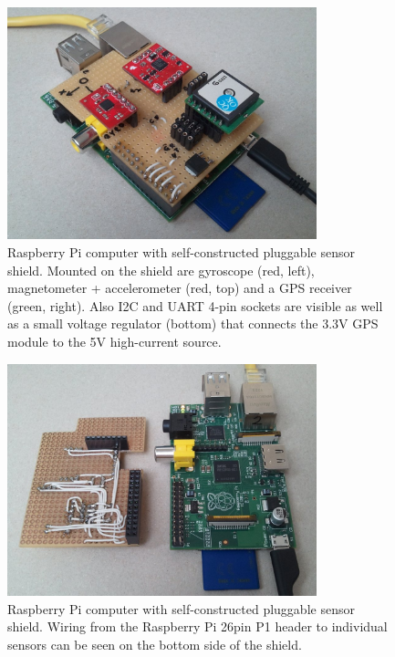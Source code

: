 \begin{figure}
\centering
\includegraphics[width=0.8\textwidth]{figures/raspberry-sensors-top.jpg}
\caption[Raspberry Pi computer with self-constructed pluggable sensor shield]{Raspberry Pi computer with self-constructed pluggable sensor shield.
Mounted on the shield are gyroscope (red, left), magnetometer + accelerometer (red, top) and a GPS receiver (green, right).
Also I2C and UART 4-pin sockets are visible as well as a small voltage regulator (bottom) that connects the 3.3V GPS module to the 5V high-current source.}
\label{fig:raspberry-sensors-top}
\end{figure}

\begin{figure}
\centering
\includegraphics[width=0.8\textwidth]{figures/raspberry-sensors-open.jpg}
\caption[Raspberry Pi computer with self-constructed pluggable sensor shield]{Raspberry Pi computer with self-constructed pluggable sensor shield.
Wiring from the Raspberry Pi 26pin P1 header to individual sensors can be seen on the bottom side of the shield.}
\label{fig:raspberry-sensors-open}
\end{figure}

